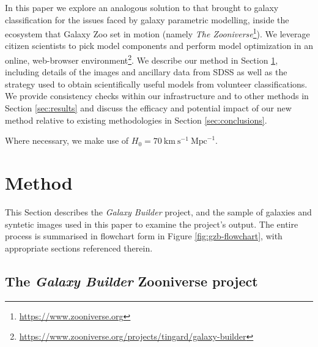 \documentclass[trackchanges]{aastex63}
\begin{document}
In this paper we explore an analogous solution to that \citet{Lintott2008:0804.4483v1} brought to galaxy classification for the issues faced by galaxy parametric modelling, inside the ecosystem that Galaxy Zoo set in motion (namely {\it The Zooniverse}\footnote{\url{https://www.zooniverse.org}}). We leverage citizen scientists to pick model components and perform model optimization in an online, web-browser environment\footnote{\url{https://www.zooniverse.org/projects/tingard/galaxy-builder}}. We describe our method in Section \ref{sec:method}, including details of the images and ancillary data from SDSS as well as the strategy used to obtain scientifically useful models from volunteer classifications. We provide consistency checks within our infrastructure and to other methods in Section \ref{sec:results} and discuss the efficacy and potential impact of our new method relative to existing methodologies in Section \ref{sec:conclusions}.

Where necessary, we make use of $H_0 = 70\ \text{km}\ \text{s}^{-1}\ \text{Mpc}^{-1}$.


\section{Method}
\label{sec:method}
This Section describes the \textit{Galaxy Builder} project, and the sample of galaxies and syntetic images used in this paper to examine the project's output. The entire process is summarised in flowchart form in Figure \ref{fig:gzb-flowchart}, with appropriate sections referenced therein.

\begin{figure*}
  \caption{Flowchart detailing the entire \textit{Galaxy Builder} process, from image creation, through classification collection using the Zooniverse, to model aggregation and fitting. Processes, manual input, data inputs and exports, and document exports are displayed distinctly. Colours distinguish between component-specific processes (disc in blue, bulge in orange, bar in green and spiral in red). Black nodes relate to the galaxy as a whole.}
  \label{fig:gzb-flowchart}
\end{figure*}

\subsection{The \textit{Galaxy Builder} Zooniverse project}
\end{document}
